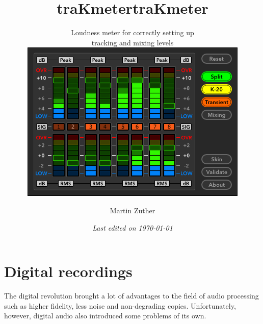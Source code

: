 


\title{traKmeter}
\author{Martin Zuther}



\title{traKmeter}

\subtitle{
  \normalsize{\textrm{\textmd{
        \vfill
        Loudness meter for correctly setting up \\
        tracking and mixing levels
        \vfill
        \vspace{1.5em}
        \includegraphics[scale=0.45,clip]{include/images/trakmeter.png}
        \vfill
      }}}
}

\author{}

\date{\emph{Last edited on \today}}

\dedication{ This documentation by
  \href{http://www.mzuther.de/}{Martin Zuther} is licensed under a
  \href{http://creativecommons.org/licenses/by-sa/4.0/}{Creative
    Commons Attribution-ShareAlike 4.0 International License} with the
  exception of the GPL, VST and ASIO logos.}

\maketitle

\tableofcontents

\clearpage  %

\chapter{Digital recordings}
\label{chap:digital_recordings}

The digital revolution brought a lot of advantages to the field of
audio processing such as higher fidelity, less noise and non-degrading
copies.  Unfortunately, however, digital audio also introduced some
problems of its own.


